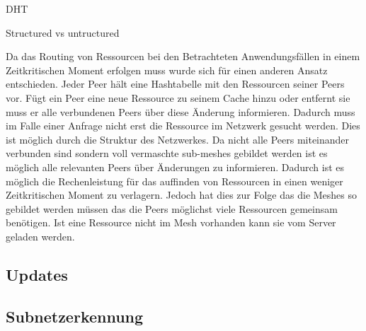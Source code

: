 DHT

Structured vs untructured

Da das Routing von Ressourcen bei den Betrachteten Anwendungsfällen in einem Zeitkritischen Moment erfolgen muss wurde sich für einen anderen Ansatz entschieden. Jeder Peer hält eine Hashtabelle mit den Ressourcen seiner Peers vor. Fügt ein Peer eine neue Ressource zu seinem Cache hinzu oder entfernt sie muss er alle verbundenen Peers über diese Änderung informieren. Dadurch muss im Falle einer Anfrage nicht erst die Ressource im Netzwerk gesucht werden. Dies ist möglich durch die Struktur des Netzwerkes. Da nicht alle Peers miteinander verbunden sind sondern voll vermaschte sub-meshes gebildet werden ist es möglich alle relevanten Peers über Änderungen zu informieren. Dadurch ist es möglich die Rechenleistung für das auffinden von Ressourcen in einen weniger Zeitkritischen Moment zu verlagern. Jedoch hat dies zur Folge das die Meshes so gebildet werden müssen das die Peers möglichst viele Ressourcen gemeinsam benötigen. Ist eine Ressource nicht im Mesh vorhanden kann sie vom Server geladen werden. 


%

%
%


\subsection{ Updates }
\subsection{Subnetzerkennung}
